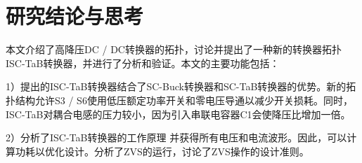 \documentclass[12pt,a4paper]{report}
\begin{document}
\chapter{研究结论与思考}

本文介绍了高降压DC / DC转换器的拓扑，讨论并提出了一种新的转换器拓扑ISC-TaB转换器，并进行了分析和验证。本文的主要功能包括：

1）提出的ISC-TaB转换器结合了SC-Buck转换器和SC-TaB转换器的优势。新的拓扑结构允许S3 / S6使用低压额定功率开关和零电压导通以减少开关损耗。同时，ISC-TaB对耦合电感的压力较小，因为引入串联电容器C1会使降压比增加一倍。

2）分析了ISC-TaB转换器的工作原理
并获得所有电压和电流波形。因此，可以计算功耗以优化设计。分析了ZVS的运行，讨论了ZVS操作的设计准则。
\end{document}
